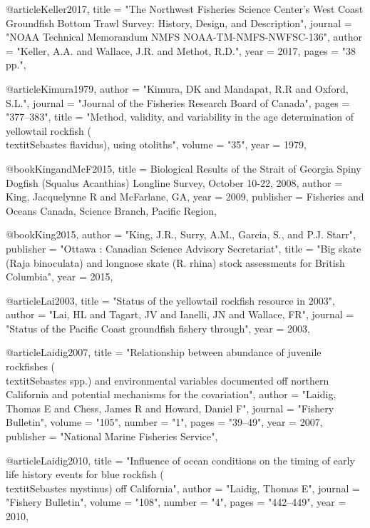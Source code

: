 @article{Keller2017,
    title = "{The Northwest Fisheries Science Center's West Coast Groundfish Bottom Trawl Survey: History, Design, and Description}",
    journal = "{NOAA Technical Memorandum NMFS NOAA-TM-NMFS-NWFSC-136}",
    author = "{Keller, A.A. and Wallace, J.R. and Methot, R.D.}",
    year = 2017,
    pages = "{38 pp.}",
}

@article{Kimura1979,
    author = "{Kimura, DK and Mandapat, R.R and Oxford, S.L.}",
    journal = "{Journal of the Fisheries Research Board of Canada}",
    pages = "{377--383}",
    title = "{{Method, validity, and variability in the age determination of yellowtail rockfish (\\textit{{Sebastes} flavidus}), using otoliths}}",
    volume = "{35}",
    year = 1979,
}

@book{KingandMcF2015,
  title = {Biological Results of the Strait of Georgia Spiny Dogfish (Squalus Acanthias) Longline Survey, October 10-22, 2008},
  author = {King, Jacquelynne R and McFarlane, GA},
  year = 2009,
  publisher = {Fisheries and Oceans Canada, Science Branch, Pacific Region},
}


@book{King2015,
    author = "{King, J.R., Surry, A.M., Garcia, S., and P.J. Starr}",
    publisher = "{Ottawa : Canadian Science Advisory Secretariat}",
    title = "{Big skate (Raja binoculata) and longnose skate (R. rhina) stock assessments for British Columbia}",
    year = 2015,
}

@article{Lai2003,
    title = "{Status of the yellowtail rockfish resource in 2003}",
    author = "{Lai, HL and Tagart, JV and Ianelli, JN and Wallace, FR}",
    journal = "{Status of the Pacific Coast groundfish fishery through}",
    year = 2003,
}

@article{Laidig2007,
    title = "{Relationship between abundance of juvenile rockfishes (\\textit{{{Sebastes}}} spp.) and environmental variables documented off northern California and potential mechanisms for the covariation}",
    author = "{Laidig, Thomas E and Chess, James R and Howard, Daniel F}",
    journal = "{Fishery Bulletin}",
    volume = "{105}",
    number = "{1}",
    pages = "{39--49}",
    year = 2007,
    publisher = "{National Marine Fisheries Service}",
}

@article{Laidig2010,
    title = "{Influence of ocean conditions on the timing of early life history events for blue rockfish (\\textit{{{Sebastes}} mystinus}) off California}",
    author = "{Laidig, Thomas E}",
    journal = "{Fishery Bulletin}",
    volume = "{108}",
    number = "{4}",
    pages = "{442--449}",
    year = 2010,
}

